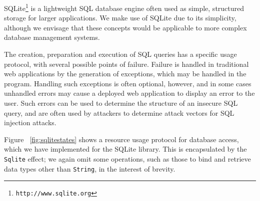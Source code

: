 \documentclass[preprint]{sigplanconf}
\begin{document}
SQLite\footnote{\texttt{http://www.sqlite.org}} is a lightweight SQL database engine often used as simple, structured storage for larger applications. We make use of SQLite due to its simplicity, although we envisage that these concepts would be applicable to more complex database management systems. 

The creation, preparation and execution of SQL queries has a specific usage protocol, with several possible points of failure. Failure is handled in traditional web applications by the generation of exceptions, which may be handled in the program.
Handling such exceptions is often optional, however, and in some cases unhandled errors may cause a deployed web application to display an error to the user. Such errors can be used to determine the structure of an insecure SQL query, and are often used by attackers to determine attack vectors for SQL injection attacks.

Figure ~\ref{fig:sqlitestates} shows a resource usage protocol for database access, which we have implemented for the SQLite library. This is encapsulated by the \texttt{Sqlite} effect; we again omit some operations, such as those to bind and retrieve data types other than \texttt{String}, in the interest of brevity.
\end{document}
